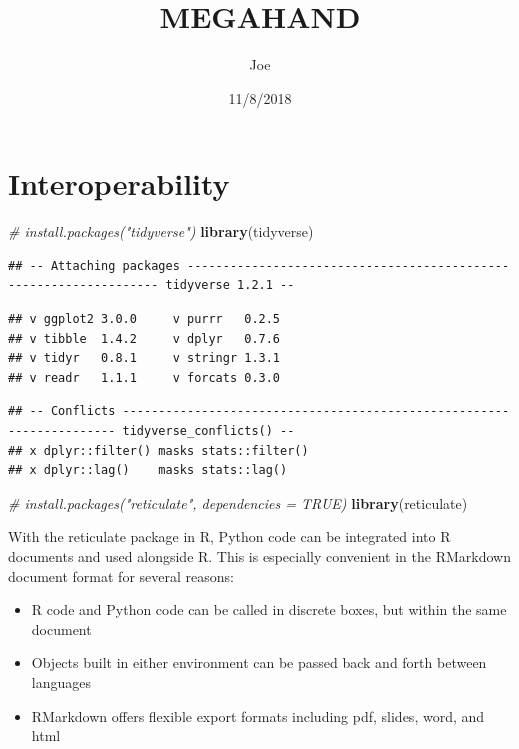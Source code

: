 \documentclass[]{article}
\title{MEGAHAND}
\author{Joe}
\date{11/8/2018}
\newenvironment{Shaded}{\begin{snugshade}}{\end{snugshade}}
\newcommand{\KeywordTok}[1]{\textcolor[rgb]{0.13,0.29,0.53}{\textbf{#1}}}
\newcommand{\CommentTok}[1]{\textcolor[rgb]{0.56,0.35,0.01}{\textit{#1}}}
\newcommand{\NormalTok}[1]{#1}
\begin{document}
\maketitle

\section{Interoperability}\label{interoperability}

\begin{Shaded}
\begin{Highlighting}[]
\CommentTok{# install.packages("tidyverse")}
\KeywordTok{library}\NormalTok{(tidyverse)}
\end{Highlighting}
\end{Shaded}

\begin{verbatim}
## -- Attaching packages ------------------------------------------------------------------ tidyverse 1.2.1 --
\end{verbatim}

\begin{verbatim}
## v ggplot2 3.0.0     v purrr   0.2.5
## v tibble  1.4.2     v dplyr   0.7.6
## v tidyr   0.8.1     v stringr 1.3.1
## v readr   1.1.1     v forcats 0.3.0
\end{verbatim}

\begin{verbatim}
## -- Conflicts --------------------------------------------------------------------- tidyverse_conflicts() --
## x dplyr::filter() masks stats::filter()
## x dplyr::lag()    masks stats::lag()
\end{verbatim}

\begin{Shaded}
\begin{Highlighting}[]
\CommentTok{# install.packages("reticulate", dependencies = TRUE)}
\KeywordTok{library}\NormalTok{(reticulate)}
\end{Highlighting}
\end{Shaded}

With the reticulate package in R, Python code can be integrated into R
documents and used alongside R. This is especially convenient in the
RMarkdown document format for several reasons:

\begin{itemize}
\item
  R code and Python code can be called in discrete boxes, but within the
  same document
\item
  Objects built in either environment can be passed back and forth
  between languages
\item
  RMarkdown offers flexible export formats including pdf, slides, word,
  and html
\end{itemize}
\end{document}
